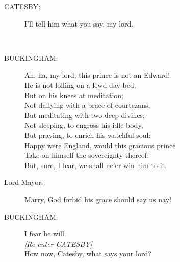 \documentclass{article}
\begin{document}
\begin{description}
\item[CATESBY:] 
\hspace{1pt}I'll tell him what you say, my lord.\\
\end{description}
\centering{\it [Exit]}\\
\begin{description}
\item[BUCKINGHAM:] 
\hspace{1pt}Ah, ha, my lord, this prince is not an Edward!\\
\hspace{1pt}He is not lolling on a lewd day-bed,\\
\hspace{1pt}But on his knees at meditation;\\
\hspace{1pt}Not dallying with a brace of courtezans,\\
\hspace{1pt}But meditating with two deep divines;\\
\hspace{1pt}Not sleeping, to engross his idle body,\\
\hspace{1pt}But praying, to enrich his watchful soul:\\
\hspace{1pt}Happy were England, would this gracious prince\\
\hspace{1pt}Take on himself the sovereignty thereof:\\
\hspace{1pt}But, sure, I fear, we shall ne'er win him to it.\\
\end{description}
\begin{description}
\item[Lord Mayor:] 
\hspace{1pt}Marry, God forbid his grace should say us nay!\\
\end{description}
\begin{description}
\item[BUCKINGHAM:] 
\hspace{1pt}I fear he will.\\
{\it [Re-enter CATESBY]}\\
\hspace{1pt}How now, Catesby, what says your lord?\\
\end{description}
\end{document}
